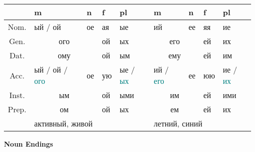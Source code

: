 \documentclass[a4paper, landscape, 11pt]{article}
\newcommand{\an}[1]{\textcolor{teal}{#1}} %
\begin{document}
\begin{tabularx}{\textwidth}{|c|X|X|X|X||X|X|X|X|}
	\hline
	  & m                   & n  & f  & pl                     & m             & n        & f  & pl           \\ \hline
	Nom. & ый / ой             & ое & ая & ые                     & ий            & ее       & яя & ие           \\
	Gen. & \multicolumn{2}{c|}{ого} & ой & ых                     & \multicolumn{2}{c|}{его} & ей & их           \\
	Dat. & \multicolumn{2}{c|}{ому} & ой & ым                     & \multicolumn{2}{c|}{ему} & ей & им           \\
	Acc. & ый / ой  / \an{ого} & ое & ую & ые / \an{ых}           & ий / \an{его} & ее       & юю & ие / \an{их} \\
	Inst. & \multicolumn{2}{c|}{ым}  & ой & ыми                    & \multicolumn{2}{c|}{им}  & ей & ими          \\
	Prep. & \multicolumn{2}{c|}{ом}  & ой & ых                     & \multicolumn{2}{c|}{ем}  & ей & их           \\ \hline
	  & \multicolumn{4}{l||}{активный, живой} & \multicolumn{4}{l|}{летний, синий}           \\ \hline
\end{tabularx}

\vfill

\begin{center}
\Huge\bfseries Noun Endings
\end{center}
\end{document}

